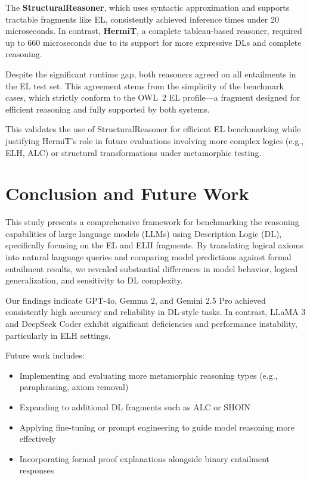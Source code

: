 \documentclass[11pt]{article}
\begin{document}
The \textbf{StructuralReasoner}, which uses syntactic approximation and supports tractable fragments like EL, consistently achieved inference times under 20 microseconds. In contrast, \textbf{HermiT}, a complete tableau-based reasoner, required up to 660 microseconds due to its support for more expressive DLs and complete reasoning.

Despite the significant runtime gap, both reasoners agreed on all entailments in the EL test set. This agreement stems from the simplicity of the benchmark cases, which strictly conform to the OWL~2 EL profile—a fragment designed for efficient reasoning and fully supported by both systems.

This validates the use of StructuralReasoner for efficient EL benchmarking while justifying HermiT’s role in future evaluations involving more complex logics (e.g., ELH, ALC) or structural transformations under metamorphic testing.


\section{Conclusion and Future Work}
This study presents a comprehensive framework for benchmarking the reasoning capabilities of large language models (LLMs) using Description Logic (DL), specifically focusing on the EL and ELH fragments. By translating logical axioms into natural language queries and comparing model predictions against formal entailment results, we revealed substantial differences in model behavior, logical generalization, and sensitivity to DL complexity.

Our findings indicate GPT-4o, Gemma 2, and Gemini 2.5 Pro achieved consistently high accuracy and reliability in DL-style tasks. In contrast, LLaMA 3 and DeepSeek Coder exhibit significant deficiencies and performance instability, particularly in ELH settings.

Future work includes:
\begin{itemize}
    \item Implementing and evaluating more metamorphic reasoning types (e.g., paraphrasing, axiom removal)
    \item Expanding to additional DL fragments such as ALC or SHOIN
    \item Applying fine-tuning or prompt engineering to guide model reasoning more effectively
    \item Incorporating formal proof explanations alongside binary entailment responses
\end{itemize}

\newpage



\nocite{*}
\end{document}
